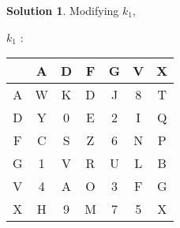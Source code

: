 \documentclass[11pt]{article}
\theoremstyle{definition}\newtheorem{definition}{Definition}
\theoremstyle{definition}\newtheorem{question}{Question}
\theoremstyle{definition}\newtheorem*{solution}{Solution}
\begin{document}
\begin{solution}
    Modifying $k_1$,
    \begin{center}
        $k_1$ : \begin{tabular}{c|cccccc}
            & A & D & F & G & V & X \\ \hline
            A & W & K & D & J & 8 & T \\
            D & Y & 0 & E & 2 & I & Q \\
            F & C & S & Z & 6 & N & P \\
            G & 1 & V & R & U & L & B \\
            V & 4 & A & O & 3 & F & G \\
            X & H & 9 & M & 7 & 5 & X \\
        \end{tabular}
    \end{center}


\end{solution}
\end{document}
